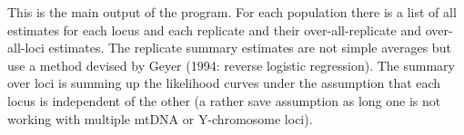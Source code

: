 This is the main output of the program. For each population there is a list
of all estimates for each locus and each replicate and their over-all-replicate and over-all-loci estimates. The replicate summary estimates are not simple averages but use a method devised by Geyer (1994: reverse logistic regression). The summary over loci is summing up the likelihood curves under the assumption that each locus is independent of the other (a rather save assumption as long one is not working with multiple mtDNA or Y-chromosome loci).
%

